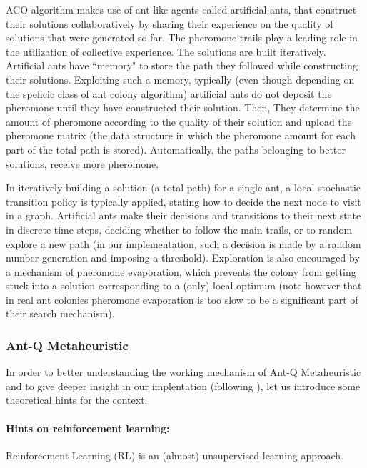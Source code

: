 \documentclass[10pt]{article}
\begin{document}
ACO  algorithm  makes use  of ant-like  agents  called artificial ants, that construct their   solutions   collaboratively   by   sharing   their experience on the quality of solutions that were generated so far.
The pheromone trails play  a  leading  role  in  the  utilization  of collective experience.
The solutions are built iteratively.
Artificial  ants  have  ``memory"  to  store  the  path  they  followed  while  constructing  their solutions.  Exploiting such a memory,  typically (even though depending on the speficic class of ant colony algorithm) artificial  ants  do not deposit  the pheromone until they have constructed their solution. Then, They determine the amount of pheromone according  to  the  quality  of  their  solution  and upload the pheromone matrix (the data structure in which the pheromone amount for each part of the total path is stored). 
Automatically, the  paths  belonging  to  better  solutions,  receive  more pheromone.

In iteratively building a solution (a total path) for a single ant, a  local  stochastic  transition  policy  is typically applied, stating how to decide the next node to visit in a graph. Artificial  ants  make  their  decisions  and  transitions  to  their  next  state  in  discrete  time steps, deciding whether to follow the main trails, or to random explore a new path (in our implementation, such a decision is made by a random number generation and imposing a threshold).
Exploration  is  also encouraged  by  a mechanism of  pheromone  evaporation, which prevents the  colony from  getting  stuck  into a solution  corresponding to a (only) local optimum (note however that in  real  ant  colonies  pheromone evaporation is too slow to be a significant part of their search mechanism).


 
\subsubsection{Ant-Q Metaheuristic}\label{sec:antq}
In order to better understanding the working mechanism of Ant-Q Metaheuristic and to give deeper insight in our implentation (following \cite{undici} ), let us introduce some theoretical hints for the context.
\paragraph{Hints on reinforcement learning:}
Reinforcement  Learning  (RL)  is  an  (almost) unsupervised  learning  approach.
\end{document}
